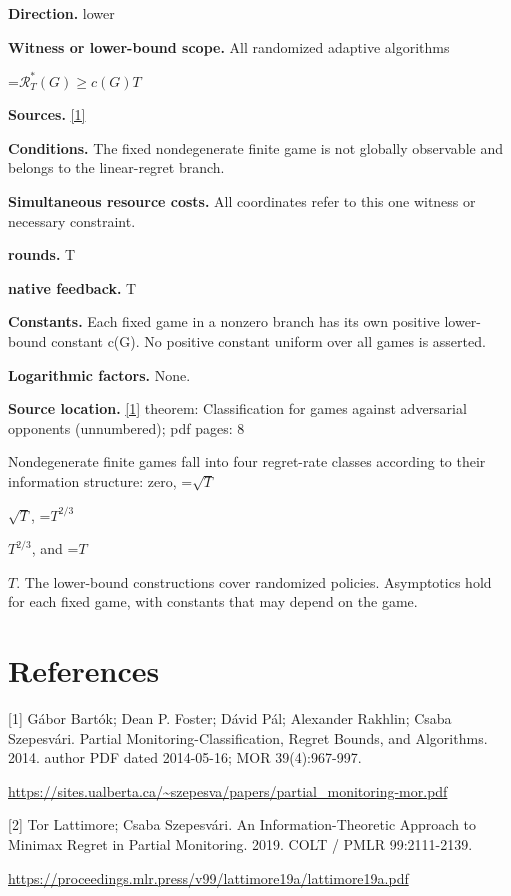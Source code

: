 \documentclass[10pt,a4paper]{article}
\newcommand{\AtlasMath}[1]{\par\begingroup\centering\setbox0=\hbox{$\displaystyle #1$}\ifdim\wd0>1.4\linewidth\typeout{ATLAS WIDE FORMULA: \the\wd0}\fi\ifdim\wd0>\linewidth\resizebox{\linewidth}{!}{\box0}\else\box0\fi\par\endgroup}
\newcommand{\AtlasInlineMath}[1]{\begingroup\setbox0=\hbox{$#1$}\ifdim\wd0>.4\linewidth\endgroup\AtlasMath{#1}\else\endgroup$#1$\fi}
\begin{document}
\textbf{Direction.} lower

\textbf{Witness or lower-bound scope.} All randomized adaptive algorithms

\AtlasMath{\mathcal{R}_T^*(G)\ge c(G)T}
\textbf{Sources.} \href{https://sites.ualberta.ca/~szepesva/papers/partial_monitoring-mor.pdf}{[1]}

\textbf{Conditions.} The fixed nondegenerate finite game is not globally observable and belongs to the linear-regret branch.

\textbf{Simultaneous resource costs.} All coordinates refer to this one witness or necessary constraint.

\textbf{rounds.} T

\textbf{native feedback.} T

\textbf{Constants.} Each fixed game in a nonzero branch has its own positive lower-bound constant c(G). No positive constant uniform over all games is asserted.

\textbf{Logarithmic factors.} None.

\textbf{Source location.} \href{https://sites.ualberta.ca/~szepesva/papers/partial_monitoring-mor.pdf}{[1]} theorem: Classification for games against adversarial opponents (unnumbered); pdf pages: 8

Nondegenerate finite games fall into four regret-rate classes according to their information structure: zero, \AtlasInlineMath{\sqrt T}, \AtlasInlineMath{T^{2/3}}, and \AtlasInlineMath{T}. The lower-bound constructions cover randomized policies. Asymptotics hold for each fixed game, with constants that may depend on the game.

\section{References}
[1] Gábor Bartók; Dean P. Foster; Dávid Pál; Alexander Rakhlin; Csaba Szepesvári. Partial Monitoring-Classification, Regret Bounds, and Algorithms. 2014. author PDF dated 2014-05-16; MOR 39(4):967-997.

\url{https://sites.ualberta.ca/~szepesva/papers/partial_monitoring-mor.pdf}

[2] Tor Lattimore; Csaba Szepesvári. An Information-Theoretic Approach to Minimax Regret in Partial Monitoring. 2019. COLT / PMLR 99:2111-2139.

\url{https://proceedings.mlr.press/v99/lattimore19a/lattimore19a.pdf}
\end{document}

